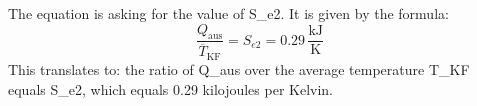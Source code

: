 The equation is asking for the value of S_{e2}. It is given by the formula:
\[
\frac{Q_{\text{aus}}}{\overline{T}_{\text{KF}}} = S_{e2} = 0.29 \, \frac{\text{kJ}}{\text{K}}
\]
This translates to: the ratio of Q_{aus} over the average temperature T_{KF} equals S_{e2}, which equals 0.29 kilojoules per Kelvin.
